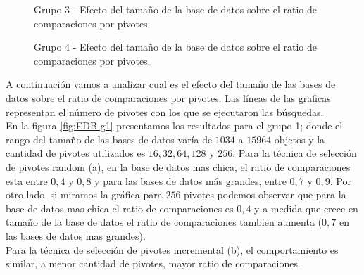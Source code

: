 \begin{figure}[tb]
\centering
{}
		\caption{\small Grupo 3 - Efecto del tamaño de la base de datos sobre el ratio de comparaciones por pivotes.}
		\label{fig:EDB-g3}
\end{figure}

\begin{figure}[tb]
\centering
{}
		\caption{\small Grupo 4 - Efecto del tamaño de la base de datos sobre el ratio de comparaciones por pivotes.}
		\label{fig:EDB-g4}
\end{figure}
 
A continuaci\'on vamos a analizar cual es el efecto del tama\~no de las bases de datos sobre el ratio de comparaciones por pivotes. Las l\'ineas de las graficas representan el n\'umero de pivotes con los que se ejecutaron las b\'usquedas.\\

En la figura \ref{fig:EDB-g1} presentamos los resultados para el grupo 1; donde el rango del tama\~no de las bases de datos varía de $1034$ a $15964$ objetos y la cantidad de pivotes utilizados es $16, 32, 64, 128$ y $256$. Para la t\'ecnica de selecci\'on de pivotes random (a), en la base de datos mas chica, el ratio de comparaciones esta entre $0,4$ y $0,8$ y para las bases de datos m\'as grandes, entre $0,7$ y $0,9$. Por otro lado, si miramos la gr\'afica para $256$ pivotes podemos observar que para la base de datos mas chica el ratio de comparaciones es $0,4$ y a medida que crece en tama\~no de la base de datos el ratio de comparaciones tambien aumenta ($0,7$ en las bases de datos mas grandes).\\

Para la t\'ecnica de selecci\'on de pivotes incremental (b), el comportamiento es similar, a menor cantidad de pivotes, mayor ratio de comparaciones.\\


